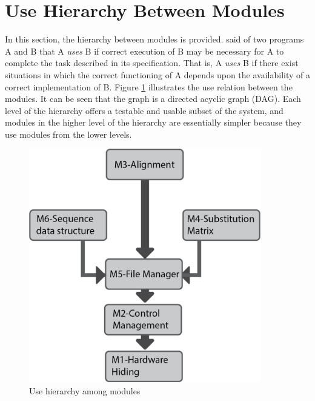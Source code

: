 \documentclass[12pt, titlepage]{article}
\begin{document}
\section{Use Hierarchy Between Modules} \label{SecUse}

In this section, the hierarchy between modules is
provided. \citet{Parnas1978} said of two programs A and B that A {\em uses} B if
correct execution of B may be necessary for A to complete the task described in
its specification. That is, A {\em uses} B if there exist situations in which
the correct functioning of A depends upon the availability of a correct
implementation of B.  Figure \ref{FigUH} illustrates the use relation between
the modules. It can be seen that the graph is a directed acyclic graph
(DAG). Each level of the hierarchy offers a testable and usable subset of the
system, and modules in the higher level of the hierarchy are essentially simpler
because they use modules from the lower levels.



\begin{figure}[H]
\centering
\includegraphics[width=0.9\textwidth]{module_inter_2.png}
\caption{Use hierarchy among modules}
\label{FigUH}
\end{figure}
\end{document}
